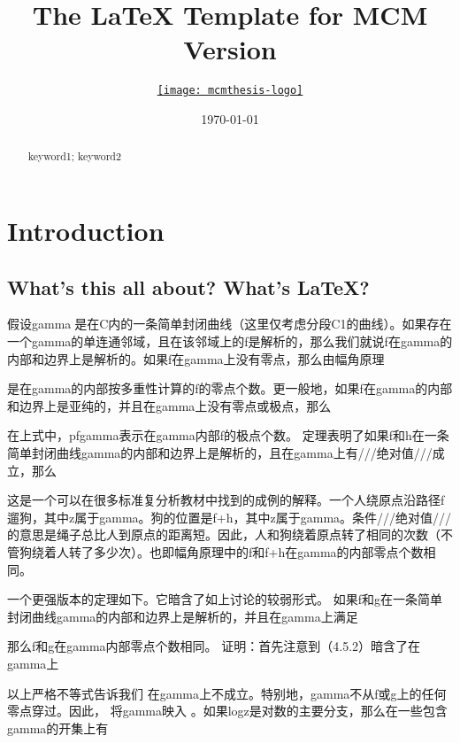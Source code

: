 \documentclass{mcmthesis}
\title{The \LaTeX{} Template for MCM Version \MCMversion}
\author{\small \href{http://www.latexstudio.net/}
  {\texttt{[image: mcmthesis-logo]}}}
\date{\today}
\begin{document}
\begin{abstract}
\lipsum[1]
\begin{keywords}
keyword1; keyword2
\end{keywords}
\end{abstract}
\maketitle
\section{Introduction}
\subsection{What's this all about? What's \LaTeX?}
假设gamma是在C内的一条简单封闭曲线（这里仅考虑分段C1的曲线）。如果存在一个gamma的单连通邻域，且在该邻域上的f是解析的，那么我们就说f在gamma的内部和边界上是解析的。如果f在gamma上没有零点，那么由幅角原理


是在gamma的内部按多重性计算的f的零点个数。更一般地，如果f在gamma的内部和边界上是亚纯的，并且在gamma上没有零点或极点，那么

在上式中，pfgamma表示在gamma内部f的极点个数。
定理表明了如果f和h在一条简单封闭曲线gamma的内部和边界上是解析的，且在gamma上有///绝对值///成立，那么


这是一个可以在很多标准复分析教材中找到的成例的解释。一个人绕原点沿路径f遛狗，其中z属于gamma。狗的位置是f+h，其中z属于gamma。条件///绝对值///的意思是绳子总比人到原点的距离短。因此，人和狗绕着原点转了相同的次数（不管狗绕着人转了多少次）。也即幅角原理中的f和f+h在gamma的内部零点个数相同。

一个更强版本的定理如下。它暗含了如上讨论的较弱形式。
如果f和g在一条简单封闭曲线gamma的内部和边界上是解析的，并且在gamma上满足

那么f和g在gamma内部零点个数相同。
证明：首先注意到（4.5.2）暗含了在gamma上


以上严格不等式告诉我们       在gamma上不成立。特别地，gamma不从f或g上的任何零点穿过。因此，     将gamma映入      。如果logz是对数的主要分支，那么在一些包含gamma的开集上有
\end{document}
